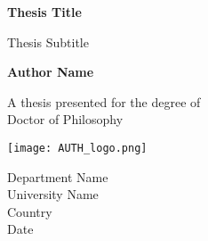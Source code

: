 \begin{titlepage}
   \begin{center}
       \vspace*{1cm}

       \textbf{Thesis Title}

       \vspace{0.5cm}
        Thesis Subtitle
            
       \vspace{1.5cm}

       \textbf{Author Name}

       \vfill
            
       A thesis presented for the degree of\\
       Doctor of Philosophy
            
       \vspace{0.8cm}
     
       \texttt{[image: AUTH\_logo.png]}
            
       Department Name\\
       University Name\\
       Country\\
       Date
            
   \end{center}
\end{titlepage}